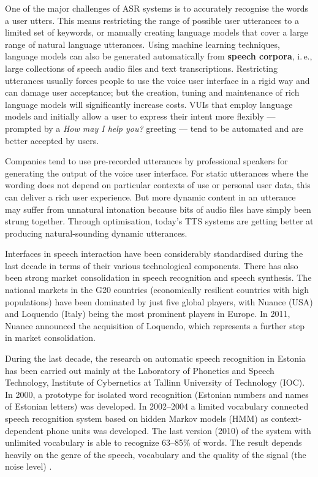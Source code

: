 \documentclass[]{../metanetpaper}
\begin{document}
\begin{multicols}{2}
One of the major challenges of ASR systems is to accurately recognise the words a user utters. This means restricting the range of possible user utterances to a limited set of keywords, or manually creating language models that cover a large range of natural language utterances. Using machine learning techniques, language models can also be generated automatically from \textbf{speech corpora}, i.\,e., large collections of speech audio files and text transcriptions. Restricting utterances usually forces people to use the voice user interface in a rigid way and can damage user acceptance; but the creation, tuning and maintenance of rich language models will significantly increase costs. VUIs that employ language models and initially allow a user to express their intent more flexibly — prompted by a \textit{How may I help you?} greeting — tend to be automated and are better accepted by users.


Companies tend to use pre-recorded utterances by professional speakers for generating the output of the voice user interface. For static utterances where the wording does not depend on particular contexts of use or personal user data, this can deliver a rich user experience. But more dynamic content in an utterance may suffer from unnatural intonation because bits of audio files have simply been strung together. Through optimisation, today’s TTS systems are getting better at producing natural-sounding dynamic utterances.

Interfaces in speech interaction have been considerably standardised during the last decade in terms of their various technological components. There has also been strong market consolidation in speech recognition and speech synthesis. The national markets in the G20 countries (economically resilient countries with high populations) have been dominated by just five global players, with Nuance (USA) and Loquendo (Italy) being the most prominent players in Europe. In 2011, Nuance announced the acquisition of Loquendo, which represents a further step in market consolidation.

During the last decade, the research on automatic speech recognition in Estonia has been carried out mainly at the Laboratory of Phonetics and Speech Technology, Institute of Cybernetics at Tallinn University of Technology (IOC). 
In 2000, a prototype for isolated word recognition (Estonian numbers and names of Estonian letters) was developed. In 2002--2004 a limited vocabulary connected speech recognition system based on hidden Markov models (HMM) as context-dependent phone units was developed. 
The last version (2010) of the system with unlimited vocabulary is able to recognize 63--85\% of words. 
The result depends heavily on the genre of the speech, vocabulary and the quality of the signal (the noise level) \cite{Phon}.


\end{multicols}
\end{document}
